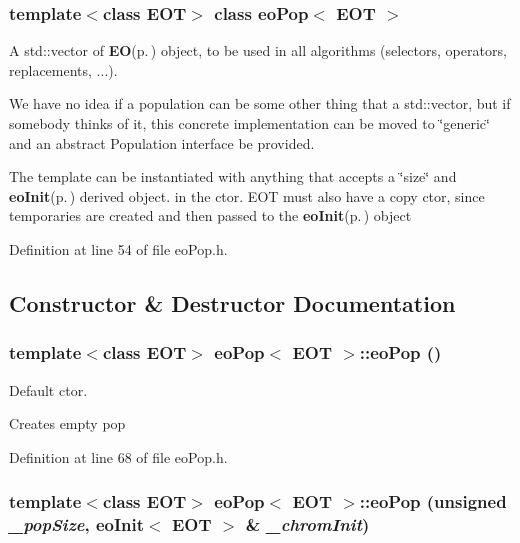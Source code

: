 \subsubsection*{template$<$class EOT$>$ class eo\-Pop$<$ EOT $>$}

A std::vector of {\bf EO}{\rm (p.\,\pageref{class_e_o})} object, to be used in all algorithms (selectors, operators, replacements, ...). 

We have no idea if a population can be some other thing that a std::vector, but if somebody thinks of it, this concrete implementation can be moved to \char`\"{}generic\char`\"{} and an abstract Population interface be provided.

The template can be instantiated with anything that accepts a \char`\"{}size\char`\"{} and {\bf eo\-Init}{\rm (p.\,\pageref{classeo_init})} derived object. in the ctor. EOT must also have a copy ctor, since temporaries are created and then passed to the {\bf eo\-Init}{\rm (p.\,\pageref{classeo_init})} object 



Definition at line 54 of file eo\-Pop.h.

\subsection{Constructor \& Destructor Documentation}
\subsubsection{\setlength{\rightskip}{0pt plus 5cm}template$<$class EOT$>$ {\bf eo\-Pop}$<$ {\bf EOT} $>$::{\bf eo\-Pop} ()\hspace{0.3cm}{\tt  [inline]}}\label{classeo_pop_a0}


Default ctor. 

Creates empty pop

Definition at line 68 of file eo\-Pop.h.
\subsubsection{\setlength{\rightskip}{0pt plus 5cm}template$<$class EOT$>$ {\bf eo\-Pop}$<$ {\bf EOT} $>$::{\bf eo\-Pop} (unsigned {\em \_\-pop\-Size}, {\bf eo\-Init}$<$ {\bf EOT} $>$ \& {\em \_\-chrom\-Init})\hspace{0.3cm}{\tt  [inline]}}\label{classeo_pop_a1}


